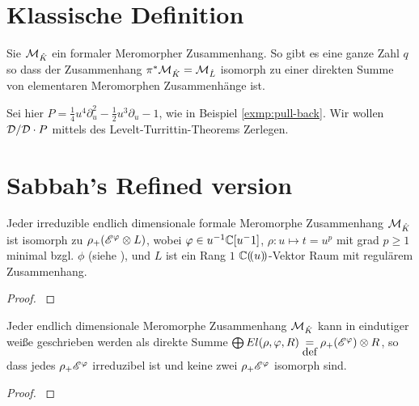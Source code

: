 \section{Klassische Definition}
\begin{comment}
\cite[Page 34]{sabbah_cimpa90}
Sei $\cM_{\hat K}$ ein formaler Meromorpher Zusammenhang. Man definiert
$\pi^*\cM_{\hat K}$ als den Vektor Raum über $\hat L:\pi^*\cM_{\hat K}=\hat
L\otimes_{\hat K}\cM_{\hat K}$. Dann definiert man die Wirkung von
$\partial_t$ durch: $t\partial_t\cdot(1\otimes
m)=q(1\otimes(x\partial_x\otimes m))$ und damit
\[
t\partial_t\cdot(\phi\otimes m)=q(\phi\otimes(x\partial_x\cdot
m))+((t\frac{\partial\phi}{\partial t})\otimes m) \,.
\]
\end{comment}
\begin{thm}
\cite[Thm 5.4.7]{sabbah_cimpa90}
Sie $\mathcal{M}_{\hat K}$ ein formaler Meromorpher Zusammenhang. So gibt es eine
ganze Zahl $q$ so dass der Zusammenhang $\pi^*\mathcal{M}_{\hat K}=\mathcal{M}_{\hat L}$
isomorph zu einer direkten Summe von elementaren Meromorphen Zusammenhänge
ist.
\end{thm}

\begin{exmp}
Sei hier $P=\frac{1}{4}u^4\partial_u^2-\frac{1}{2}u^3\partial_u-1$, wie in
Beispiel \ref{exmp:pull-back}.
Wir wollen $\mathcal{D}/\mathcal{D}\cdot P$ mittels des Levelt-Turrittin-Theorems Zerlegen.
\end{exmp}

\section{Sabbah's Refined version}

\begin{prop}
\cite[Prop 3.1]{sabbah_Fourier-local}
Jeder irreduzible endlich dimensionale formale Meromorphe Zusammenhang
$\mathcal{M}_{\hat K}$ ist isomorph zu $\rho_+(\mathscr{E}^\varphi\otimes L)$, wobei $\varphi\in
u^{-1}\mathbb{C}[u^-1]$, $\rho:u\mapsto t=u^p$ mit grad $p\geq1$ minimal bzgl. $\phi$
(siehe \cite[Rem 2.8]{sabbah_Fourier-local}), und $L$ ist ein Rang $1$
${\mathbb C (\!(u)\!)}$-Vektor Raum mit regulärem Zusammenhang.
\end{prop}
\begin{proof}
\cite[Prop 3.1]{sabbah_Fourier-local}
\end{proof}

\begin{thm}
\cite[Cor 3.3]{sabbah_Fourier-local}
Jeder endlich dimensionale Meromorphe Zusammenhang $\mathcal{M}_{\hat K}$ kann in
eindutiger weiße geschrieben werden als direkte Summe $\bigoplus
El(\rho,\varphi,R)\underset{\mbox{def}}{=}\rho_+(\mathscr{E}^\varphi)\otimes R$, so dass
jedes $\rho_+\mathscr{E}^\varphi$ irreduzibel ist und keine zwei $\rho_+\mathscr{E}^\varphi$ isomorph
sind.
\end{thm}
\begin{proof}
\cite[Cor 3.3]{sabbah_Fourier-local}
\end{proof}

